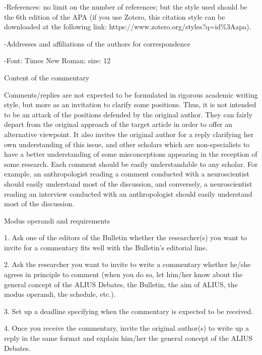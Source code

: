 \documentclass[11pt]{article}
\begin{document}
-References: no limit on the number of references; but the style used should be the 6th edition of the APA (if you use Zotero, this citation style can be downloaded at the following link: https://www.zotero.org/styles?q=id\%3Aapa).\par

-Addresses and affiliations of the authors for correspondence\par

-Font: Times New Roman; size: 12\par

Content of the commentary\par

Comments/replies are not expected to be formulated in rigorous academic writing style, but more as an invitation to clarify some positions. Thus, it is not intended to be an attack of the positions defended by the original author. They can fairly depart from the original approach of the target article in order to offer an alternative viewpoint. It also invites the original author for a reply clarifying her own understanding of this issue, and other scholars which are non-specialists to have a better understanding of some misconceptions appearing in the reception of some research. Each comment should be easily understandable to any scholar. For example, an anthropologist reading a comment conducted with a neuroscientist should easily understand most of the discussion, and conversely, a neuroscientist reading an interview conducted with an anthropologist should easily understand most of the discussion.\par

Modus operandi and requirements\par

1. Ask one of the editors of the Bulletin whether the researcher(s) you want to invite for a commentary fits well with the Bulletin’s editorial line.\par

2. Ask the researcher you want to invite to write a  commentary whether he/she agrees in principle to comment (when you do so, let him/her know about the general concept of the ALIUS Debates, the Bulletin, the aim of ALIUS, the modus operandi, the schedule, etc.).\par

3. Set up a deadline specifying when the commentary is expected to be received.\par

4. Once you receive the commentary, invite the original author(s) to write up a reply in the same format and explain him/her the general concept of the ALIUS Debates.\par
\end{document}

